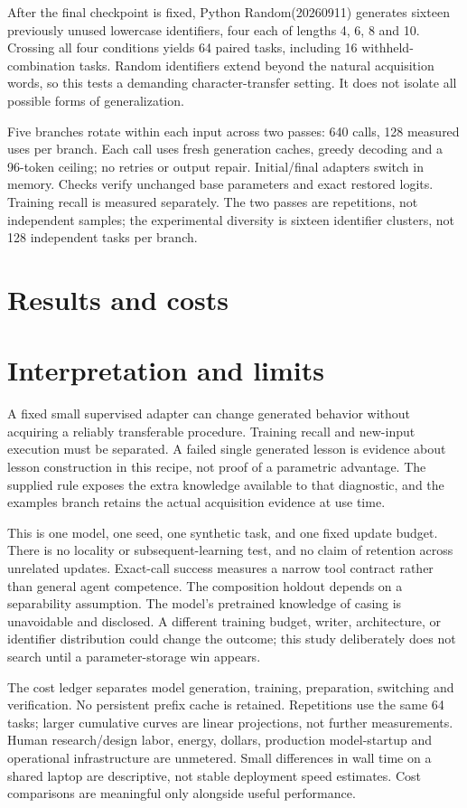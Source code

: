 \documentclass[11pt]{article}
\begin{document}
After the final checkpoint is fixed, Python Random(20260911) generates sixteen previously unused lowercase identifiers, four each of lengths 4, 6, 8 and 10. Crossing all four conditions yields 64 paired tasks, including 16 withheld-combination tasks. Random identifiers extend beyond the natural acquisition words, so this tests a demanding character-transfer setting. It does not isolate all possible forms of generalization.

Five branches rotate within each input across two passes: 640 calls, 128 measured uses per branch. Each call uses fresh generation caches, greedy decoding and a 96-token ceiling; no retries or output repair. Initial/final adapters switch in memory. Checks verify unchanged base parameters and exact restored logits. Training recall is measured separately. The two passes are repetitions, not independent samples; the experimental diversity is sixteen identifier clusters, not 128 independent tasks per branch.

\section{Results and costs}


\section{Interpretation and limits}
A fixed small supervised adapter can change generated behavior without acquiring a reliably transferable procedure. Training recall and new-input execution must be separated. A failed single generated lesson is evidence about lesson construction in this recipe, not proof of a parametric advantage. The supplied rule exposes the extra knowledge available to that diagnostic, and the examples branch retains the actual acquisition evidence at use time.

This is one model, one seed, one synthetic task, and one fixed update budget. There is no locality or subsequent-learning test, and no claim of retention across unrelated updates. Exact-call success measures a narrow tool contract rather than general agent competence. The composition holdout depends on a separability assumption. The model's pretrained knowledge of casing is unavoidable and disclosed. A different training budget, writer, architecture, or identifier distribution could change the outcome; this study deliberately does not search until a parameter-storage win appears.

The cost ledger separates model generation, training, preparation, switching and verification. No persistent prefix cache is retained. Repetitions use the same 64 tasks; larger cumulative curves are linear projections, not further measurements. Human research/design labor, energy, dollars, production model-startup and operational infrastructure are unmetered. Small differences in wall time on a shared laptop are descriptive, not stable deployment speed estimates. Cost comparisons are meaningful only alongside useful performance.
\end{document}

